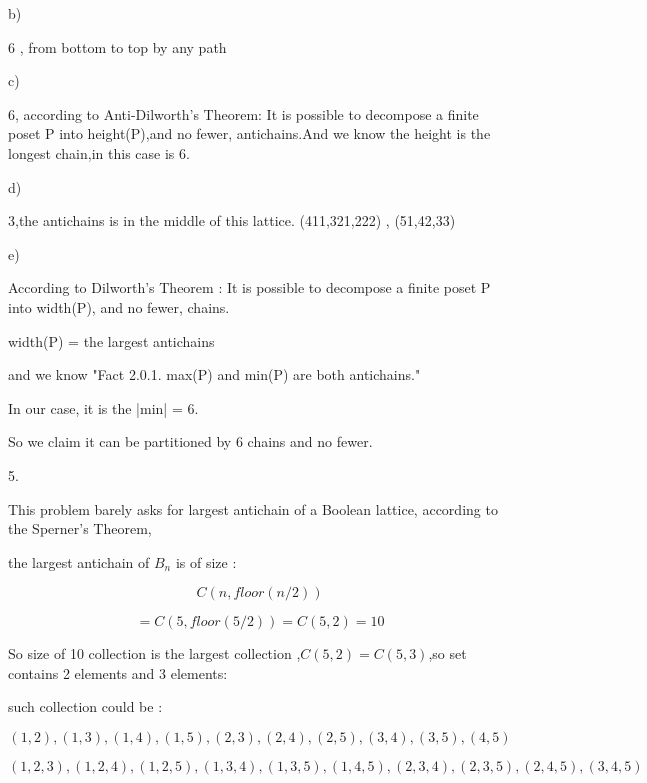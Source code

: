 \documentclass{article}
\begin{document}
b)

6 , from bottom to top by any path

c)

6, according to Anti-Dilworth’s Theorem: It is possible to decompose a finite poset P into height(P),and no fewer, antichains.And we know the height is the longest chain,in this case is 6.

d)

3,the antichains is in the middle of this lattice. (411,321,222) , (51,42,33)

e)

According to Dilworth’s Theorem : It is possible to decompose a finite poset P into
width(P), and no fewer, chains.

width(P) = the largest antichains

and we know "Fact 2.0.1. max(P) and min(P) are both antichains."

In our case, it is the |min| = 6.

So we claim it can be partitioned by 6 chains and no fewer.

5.

This problem barely asks for largest antichain of a Boolean lattice, according to the Sperner’s Theorem,

the largest antichain of $B_n$ is of size :

$$C(n,floor(n/2))$$ 

$$=C(5,floor(5/2))=C(5,2)= 10$$ 

So size of 10 collection is the largest collection ,$C(5,2)= C(5,3)$,so set contains 2 elements and 3 elements:

such collection could be : 

$$(1,2),(1,3),(1,4),(1,5),(2,3),(2,4),(2,5),(3,4),(3,5),(4,5)$$

$$(1,2,3),(1,2,4),(1,2,5),(1,3,4),(1,3,5),(1,4,5),(2,3,4),(2,3,5),(2,4,5),(3,4,5)$$
\end{document}
